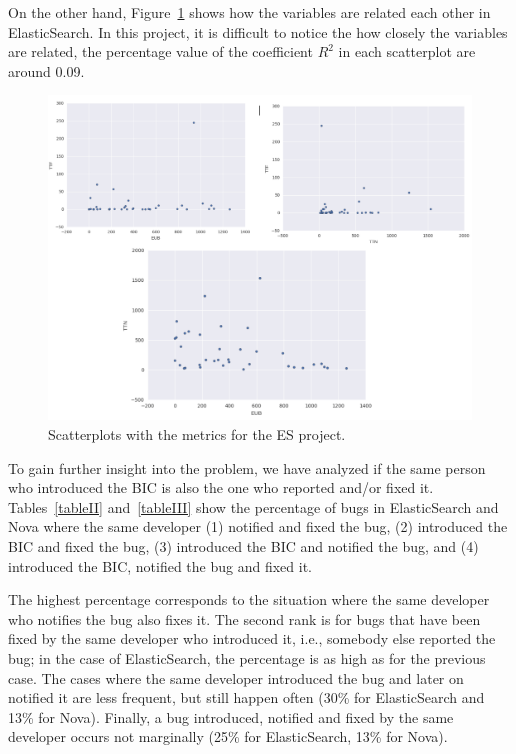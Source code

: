 \documentclass[10pt, conference]{IEEEtran}
\begin{document}
On the other hand, Figure~\ref{fig:graph1} shows how the variables are related each other in ElasticSearch. In this project, it is difficult to notice the how closely the variables are related, the percentage value of the coefficient $R^2$ in each scatterplot are around 0.09. 

\begin{figure}[ht]
\centering
\includegraphics[width=\columnwidth]{DistributionES_b.png}
\caption{Scatterplots with the metrics for the ES project.}
\label{fig:graph1}       %
\end{figure}


To gain further insight into the problem, we have analyzed if the same person who introduced the BIC is also the one who reported and/or fixed it. Tables~\ref{tableII} and~\ref{tableIII} show the percentage of bugs in ElasticSearch and Nova where the same developer (1) notified and fixed the bug, (2) introduced the BIC and fixed the bug, (3) introduced the BIC and notified the bug, and (4) introduced the BIC, notified the bug and fixed it.

The highest percentage corresponds to the situation where the same developer who notifies the bug also fixes it. The second rank is for bugs that have been fixed by the same developer who introduced it, i.e., somebody else reported the bug; in the case of ElasticSearch, the percentage is as high as for the previous case. The cases where the same developer introduced the bug and later on notified it are less frequent, but still happen often (30\% for ElasticSearch and 13\% for Nova). Finally, a bug introduced, notified and fixed by the same developer occurs not marginally (25\% for ElasticSearch, 13\% for Nova).
\end{document}

